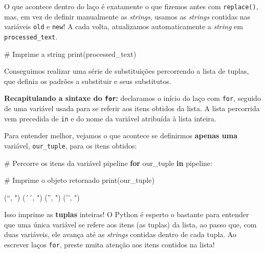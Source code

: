 \documentclass[
  brazilian,
  11pt,
]{article}
\newenvironment{Shaded}{\begin{snugshade}}{\end{snugshade}}
\newcommand{\BuiltInTok}[1]{\textcolor[rgb]{0.50,0.55,0.55}{#1}}
\newcommand{\CommentTok}[1]{\textcolor[rgb]{0.48,0.49,0.49}{#1}}
\newcommand{\ControlFlowTok}[1]{\textcolor[rgb]{0.99,0.74,0.29}{\textbf{#1}}}
\newcommand{\KeywordTok}[1]{\textcolor[rgb]{0.81,0.81,0.76}{\textbf{#1}}}
\newcommand{\NormalTok}[1]{\textcolor[rgb]{0.81,0.81,0.76}{#1}}
\let\oldtexttt\texttt
\renewcommand{\texttt}[1]{{\color{inlink}\oldtexttt{#1}}}
\begin{document}
O que acontece dentro do laço é exatamente o que fizemos antes com
\texttt{replace()}, mas, em vez de definir manualmente as
\emph{strings}, usamos as \emph{strings} contidas nas variáveis
\texttt{old} e \texttt{new}! A cada volta, atualizamos automaticamente a
\emph{string} em \texttt{processed\_text}.

\begin{Shaded}
\begin{Highlighting}[]
\CommentTok{\# Imprime a string}
\BuiltInTok{print}\NormalTok{(processed\_text)}
\end{Highlighting}
\end{Shaded}

Conseguimos realizar uma série de substituições percorrendo a lista de
tuplas, que definia os padrões a substituir e seus substitutos.

\textbf{Recapitulando a sintaxe do \texttt{for}:} declaramos o início do
laço com \texttt{for}, seguido de uma variável usada para se referir aos
itens obtidos da lista. A lista percorrida vem precedida de \texttt{in}
e do nome da variável atribuída à lista inteira.

Para entender melhor, vejamos o que acontece se definirmos
\textbf{apenas uma} variável, \texttt{our\_tuple}, para os itens
obtidos:

\begin{Shaded}
\begin{Highlighting}[]
\CommentTok{\# Percorre os itens da variável \textquotesingle{}pipeline\textquotesingle{}}
\ControlFlowTok{for}\NormalTok{ our\_tuple }\KeywordTok{in}\NormalTok{ pipeline:}

    \CommentTok{\# Imprime o objeto retornado}
    \BuiltInTok{print}\NormalTok{(our\_tuple)}
\end{Highlighting}
\end{Shaded}

\begin{Shaded}
\begin{Highlighting}[]
\NormalTok{(\textquotesingle{}“\textquotesingle{}, \textquotesingle{}"\textquotesingle{})}
\NormalTok{(\textquotesingle{}´´\textquotesingle{}, \textquotesingle{}"\textquotesingle{})}
\NormalTok{(\textquotesingle{}”\textquotesingle{}, \textquotesingle{}"\textquotesingle{})}
\NormalTok{(\textquotesingle{}’’\textquotesingle{}, \textquotesingle{}"\textquotesingle{})}
\end{Highlighting}
\end{Shaded}

Isso imprime as \textbf{tuplas} inteiras! O Python é esperto o bastante
para entender que uma única variável se refere aos itens (as tuplas) da
lista, ao passo que, com duas variáveis, ele avança até as
\emph{strings} contidas dentro de cada tupla. Ao escrever laços
\texttt{for}, preste muita atenção aos itens contidos na lista!
\end{document}
